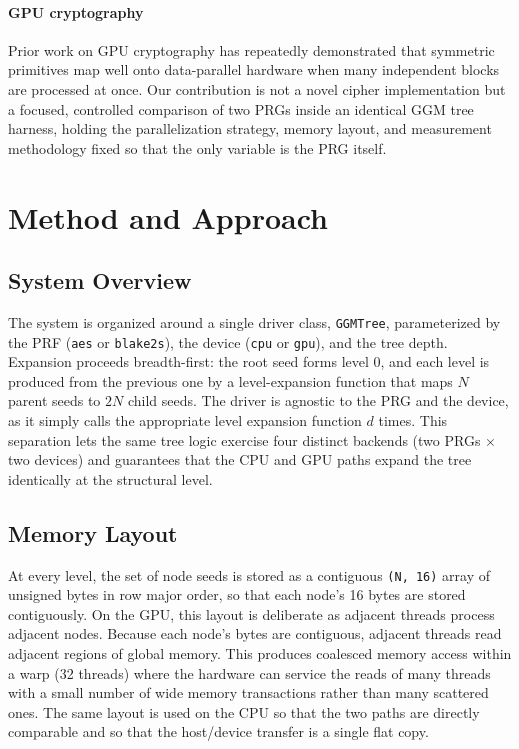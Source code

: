 \documentclass[conference]{IEEEtran}
\begin{document}
\paragraph{GPU cryptography}
Prior work on GPU cryptography has repeatedly demonstrated that symmetric primitives map well onto data-parallel hardware when many independent blocks are processed at once. Our contribution is not a novel cipher implementation but a focused, controlled comparison of two PRGs inside an identical GGM tree harness, holding the parallelization strategy, memory layout, and measurement methodology fixed so that the only variable is the PRG itself.

\section{Method and Approach}
\label{sec:method}

\subsection{System Overview}
The system is organized around a single driver class, \texttt{GGMTree}, parameterized by the PRF (\texttt{aes} or \texttt{blake2s}), the device (\texttt{cpu} or \texttt{gpu}), and the tree depth. Expansion proceeds breadth-first: the root seed forms level 0, and each level is produced from the previous one by a level-expansion function that maps $N$ parent seeds to $2N$ child seeds. The driver is agnostic to the PRG and the device, as it simply calls the appropriate level expansion function $d$ times. This separation lets the same tree logic exercise four distinct backends (two PRGs $\times$ two devices) and guarantees that the CPU and GPU paths expand the tree identically at the structural level.

\subsection{Memory Layout}
At every level, the set of node seeds is stored as a contiguous \texttt{(N, 16)} array of unsigned bytes in row major order, so that each node's 16 bytes are stored contiguously. On the GPU, this layout is deliberate as adjacent threads process adjacent nodes. Because each node's bytes are contiguous, adjacent threads read adjacent regions of global memory. This produces coalesced memory access within a warp (32 threads) where the hardware can service the reads of many threads with a small number of wide memory transactions rather than many scattered ones. The same layout is used on the CPU so that the two paths are directly comparable and so that the host/device transfer is a single flat copy.
\end{document}
